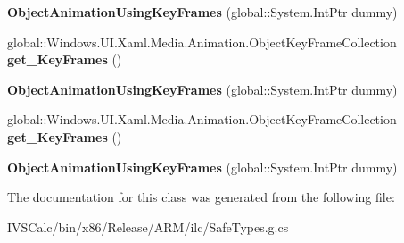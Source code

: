 \begin{DoxyCompactItemize}
{\bfseries Object\+Animation\+Using\+Key\+Frames} (global\+::\+System.\+Int\+Ptr dummy)
\item 
\mbox{\label{class_windows_1_1_u_i_1_1_xaml_1_1_media_1_1_animation_1_1_object_animation_using_key_frames_aba52657d062ddf9fbb4f6ee5cc3641af}} 
global\+::\+Windows.\+U\+I.\+Xaml.\+Media.\+Animation.\+Object\+Key\+Frame\+Collection {\bfseries get\+\_\+\+Key\+Frames} ()
\item 
\mbox{\label{class_windows_1_1_u_i_1_1_xaml_1_1_media_1_1_animation_1_1_object_animation_using_key_frames_adce5270df71160bf8c1fc1a86617c436}} 
{\bfseries Object\+Animation\+Using\+Key\+Frames} (global\+::\+System.\+Int\+Ptr dummy)
\item 
\mbox{\label{class_windows_1_1_u_i_1_1_xaml_1_1_media_1_1_animation_1_1_object_animation_using_key_frames_aba52657d062ddf9fbb4f6ee5cc3641af}} 
global\+::\+Windows.\+U\+I.\+Xaml.\+Media.\+Animation.\+Object\+Key\+Frame\+Collection {\bfseries get\+\_\+\+Key\+Frames} ()
\item 
\mbox{\label{class_windows_1_1_u_i_1_1_xaml_1_1_media_1_1_animation_1_1_object_animation_using_key_frames_adce5270df71160bf8c1fc1a86617c436}} 
{\bfseries Object\+Animation\+Using\+Key\+Frames} (global\+::\+System.\+Int\+Ptr dummy)
\end{DoxyCompactItemize}


The documentation for this class was generated from the following file\+:\begin{DoxyCompactItemize}
\item 
I\+V\+S\+Calc/bin/x86/\+Release/\+A\+R\+M/ilc/Safe\+Types.\+g.\+cs\end{DoxyCompactItemize}
